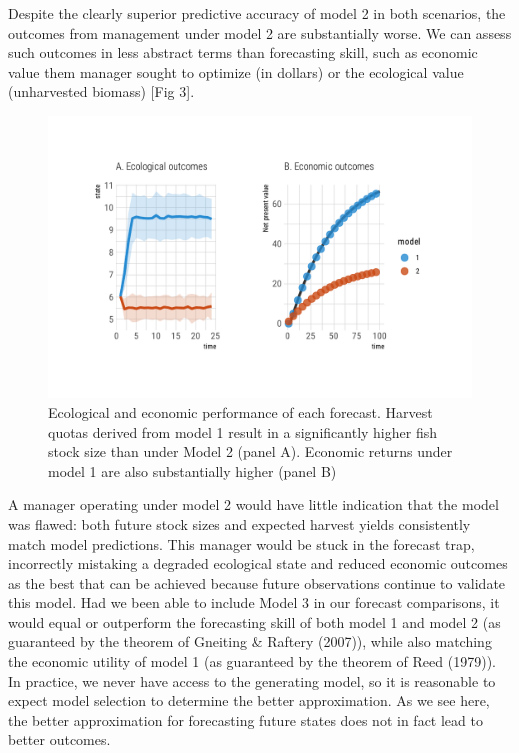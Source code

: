 \documentclass[3p]{elsarticle} %
\begin{document}
Despite the clearly superior predictive accuracy of model 2 in both
scenarios, the outcomes from management under model 2 are substantially
worse. We can assess such outcomes in less abstract terms than
forecasting skill, such as economic value them manager sought to
optimize (in dollars) or the ecological value (unharvested biomass)
{[}Fig 3{]}.

\begin{figure}
\centering
\includegraphics{manuscript_files/figure-latex/figure3-1.pdf}
\caption{Ecological and economic performance of each forecast. Harvest
quotas derived from model 1 result in a significantly higher fish stock
size than under Model 2 (panel A). Economic returns under model 1 are
also substantially higher (panel B)}
\end{figure}

A manager operating under model 2 would have little indication that the
model was flawed: both future stock sizes and expected harvest yields
consistently match model predictions. This manager would be stuck in the
forecast trap, incorrectly mistaking a degraded ecological state and
reduced economic outcomes as the best that can be achieved because
future observations continue to validate this model. Had we been able to
include Model 3 in our forecast comparisons, it would equal or
outperform the forecasting skill of both model 1 and model 2 (as
guaranteed by the theorem of Gneiting \& Raftery (2007)), while also
matching the economic utility of model 1 (as guaranteed by the theorem
of Reed (1979)). In practice, we never have access to the generating
model, so it is reasonable to expect model selection to determine the
better approximation. As we see here, the better approximation for
forecasting future states does not in fact lead to better outcomes.
\end{document}
